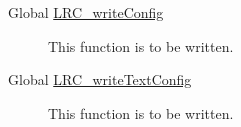 \label{todo__todo000006}
\hypertarget{todo__todo000006}{}
 \begin{description}
\item[Global \hyperlink{group___l_r_c__wrappers_g51e21668c4d2e0f397b7d20ac8b9cc50}{LRC\_\-writeConfig} ]This function is to be written. \end{description}


\label{todo__todo000007}
\hypertarget{todo__todo000007}{}
 \begin{description}
\item[Global \hyperlink{group___l_r_c__wrappers_g42c90a023c4cc3048b39a65245e889e4}{LRC\_\-writeTextConfig} ]This function is to be written. \end{description}

